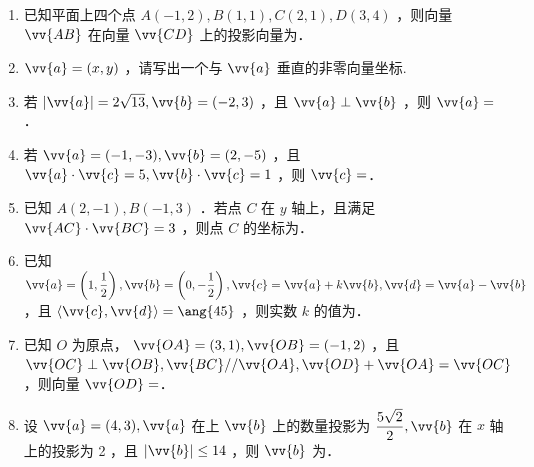 \begin{enumerate}
    \item 已知平面上四个点 $A(-1,2), B(1,1), C(2,1), D(3,4)$ ，则向量 $\vv{A B}$ 在向量 $\vv{C D}$ 上的投影向量为．

    \item $\vv{a}=(x, y)$ ，请写出一个与 $\vv{a}$ 垂直的非零向量坐标.

    \item 若 $|\vv{a}|=2 \sqrt{13}, \vv{b}=(-2,3)$ ，且 $\vv{a} \perp \vv{b}$ ，则 $\vv{a}=$．

    \item 若 $\vv{a}=(-1,-3), \vv{b}=(2,-5)$ ，且 $\vv{a} \cdot \vv{c}=5, \vv{b} \cdot \vv{c}=1$ ，则 $\vv{c}=$．

    \item 已知 $A(2,-1), B(-1,3)$ ．若点 $C$ 在 $y$ 轴上，且满足 $\vv{A C} \cdot \vv{B C}=3$ ，则点 $C$ 的坐标为．

    \item 已知 $\vv{a}=\left(1, \dfrac{1}{2}\right), \vv{b}=\left(0,-\dfrac{1}{2}\right), \vv{c}=\vv{a}+k \vv{b}, \vv{d}=\vv{a}-\vv{b}$ ，且 $\langle\vv{c}, \vv{d}\rangle=\ang{45}$ ，则实数 $k$ 的值为．

    \item 已知 $O$ 为原点， $\vv{O A}=(3,1), \vv{O B}=(-1,2)$ ，且 $\vv{O C} \perp \vv{O B}, \vv{B C} / / \vv{O A}, \vv{O D}+\vv{O A}=\vv{O C}$ ，则向量 $\vv{O D}=$．

    \item 设 $\vv{a}=(4,3), \vv{a}$ 在上 $\vv{b}$ 上的数量投影为 $\dfrac{5 \sqrt{2}}{2}, \vv{b}$ 在 $x$ 轴上的投影为 2 ，且 $|\vv{b}| \leq 14$ ，则 $\vv{b}$ 为．
\end{enumerate}

